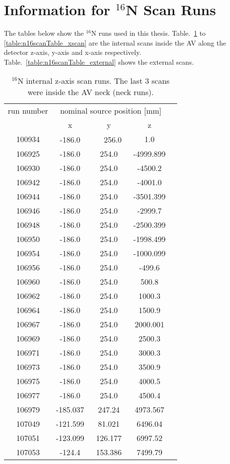 \section{Information for $^{16}$N Scan Runs}
The tables below show the $^{16}$N runs used in this thesis. Table.~\ref{table:n16scanTable_zscan} to \ref{table:n16scanTable_xscan} are the internal scans inside the AV along the detector z-axis, y-axis and x-axis respectively. Table.~\ref{table:n16scanTable_external} shows the external scans.
\begin{table}[ht]
		\caption[]{$^{16}$N internal z-axis scan runs. The last 3 scans were inside the AV neck (neck runs).}
		\label{table:n16scanTable_zscan}
			\centering
	\begin{tabular*}{90mm}{c@{\extracolsep{\fill}}*4c}
		\toprule 
		run number  & \multicolumn{3}{c}{nominal source position [mm]}  \\
                                \cline{2-4}
			& x & y & z\\
		\midrule
        100934 &-186.0　&　256.0　& 1.0\\
        106925 &-186.0 &254.0  &-4999.899\\
        106930 &-186.0 & 254.0 & -4500.2\\
        106942 &-186.0 & 254.0 & -4001.0\\
        106944 &-186.0 & 254.0 & -3501.399\\
        106946 &-186.0 & 254.0 & -2999.7\\
        106948 &-186.0 & 254.0 & -2500.399\\
        106950 &-186.0 & 254.0 & -1998.499\\
        106954 &-186.0 & 254.0 & -1000.099\\
        106956 &-186.0 & 254.0 & -499.6\\
        106960 &-186.0 & 254.0 & 500.8\\
        106962 &-186.0 & 254.0 & 1000.3\\
        106964 &-186.0 & 254.0 & 1500.9\\
        106967 &-186.0 & 254.0 & 2000.001\\
        106969 &-186.0 & 254.0 & 2500.3\\
        106971 &-186.0 & 254.0 & 3000.3\\
        106973 &-186.0 & 254.0 & 3500.9\\
        106975 &-186.0 & 254.0 & 4000.5\\
        106977 &-186.0 & 254.0 & 4500.4\\
        106979 &-185.037 & 247.24 & 4973.567\\
        107049 & -121.599 & 81.021 & 6496.04 \\
        107051 & -123.099 & 126.177 & 6997.52\\
        107053	&	-124.4 & 153.386 & 7499.79\\
        \bottomrule	
	\end{tabular*}
\end{table}        
        
